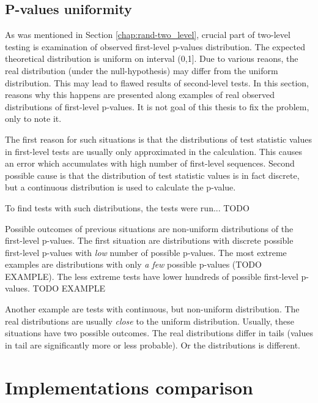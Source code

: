\documentclass[
  digital,     %
  oneside,     %
  nosansbold,  %
  nocolorbold, %
  nolof,         %
  nolot,         %
]{fithesis4}
\begin{document}
\section{P-values uniformity}
As was mentioned in Section \ref{chap:rand-two_level}, crucial part of two-level testing is examination of observed first-level p-values distribution. The expected theoretical distribution is uniform on interval (0,1]. \cite[p.~14]{bad_day} Due to various reaons, the real distribution (under the null-hypothesis) may differ from the uniform distribution. This may lead to flawed results of second-level tests. In this section, reasons why this happens are presented along examples of real observed distributions of first-level p-values. It is not goal of this thesis to fix the problem, only to note it.

The first reason for such situations is that the distributions of test statistic values in first-level tests are usually only approximated in the calculation. This causes an error which accumulates with high number of first-level sequences. Second possible cause is that the distribution of test statistic values is in fact discrete, but a continuous distribution is used to calculate the p-value.\cite[p. 7]{bad_day}

To find tests with such distributions, the tests were run... TODO

Possible outcomes of previous situations are non-uniform distributions of the first-level p-values. The first situation are distributions with discrete possible first-level p-values with \emph{low} number of possible p-values. The most extreme examples are distributions with only \emph{a few} possible p-values (TODO EXAMPLE). The less extreme tests have lower hundreds of possible first-level p-values. TODO EXAMPLE

Another example are tests with continuous, but non-uniform distribution. The real distributions are usually \emph{close} to the uniform distribution. Usually, these situations have two possible outcomes. The real distributions differ in tails (values in tail are significantly more or less probable). Or the distributions is different. 

\chapter{Implementations comparison}
\end{document}
